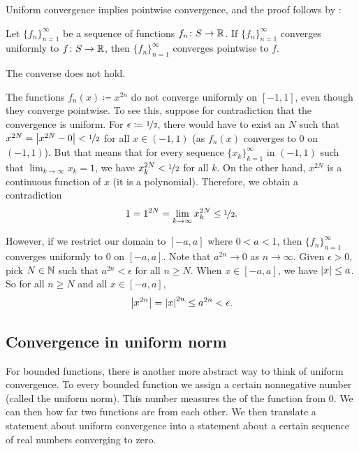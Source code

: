 Uniform convergence
implies pointwise convergence, and the proof follows by
:

\begin{prop}
Let $\{ f_n \}_{n=1}^\infty$ be a sequence of functions $f_n \colon S \to {\mathbb{R}}$.
If $\{ f_n \}_{n=1}^\infty$ converges
uniformly to $f \colon S \to {\mathbb{R}}$, then $\{ f_n \}_{n=1}^\infty$ converges pointwise to $f$.
\end{prop}

The converse does not hold.

\begin{example}
The functions $f_n(x) \coloneqq x^{2n}$ do not converge uniformly on $[-1,1]$,
even though they converge pointwise.  To see this, suppose for contradiction
that the convergence is uniform.  For $\epsilon \coloneqq \nicefrac{1}{2}$, there would have
to exist an $N$ such that $x^{2N} = \left\lvert {x^{2N} - 0} \right\rvert < \nicefrac{1}{2}$ for all $x \in
(-1,1)$ (as $f_n(x)$ converges to 0 on $(-1,1)$).  But that means that
for every sequence $\{ x_k \}_{k=1}^\infty$ in $(-1,1)$ such that $\lim_{k\to\infty} x_k = 1$,
we have $x_k^{2N} < \nicefrac{1}{2}$ for all $k$.  On the other hand,
$x^{2N}$ is a continuous function of $x$ (it is a polynomial).  Therefore,
we obtain a contradiction
\begin{equation*}
1 = 1^{2N}  = \lim_{k\to\infty} x_k^{2N} \leq \nicefrac{1}{2} .
\end{equation*}

However, if we restrict our domain to $[-a,a]$ where $0 < a < 1$, then
$\{ f_n \}_{n=1}^\infty$ converges uniformly to 0 on $[-a,a]$.  Note that
$a^{2n} \to 0$ as $n \to \infty$.  Given $\epsilon > 0$,
pick $N \in {\mathbb{N}}$ such that
$a^{2n} < \epsilon$ for all $n \geq N$.
When $x \in [-a,a]$, we have
$\left\lvert {x} \right\rvert \leq a$.  So
for all $n \geq N$ and all $x \in [-a,a]$,
\begin{equation*}
\left\lvert {x^{2n}} \right\rvert = \left\lvert {x} \right\rvert^{2n} \leq a^{2n} < \epsilon .
\end{equation*}
\end{example}

\subsection{Convergence in uniform norm}

For bounded functions, there is another more abstract way to 
think of uniform convergence.  To every bounded function we assign
a certain nonnegative number (called the uniform norm).  This number
measures the  of the function from 0.  We can then
how far two functions are from each other.  We then translate
a statement about uniform convergence into a statement about a certain
sequence of real numbers converging to zero.

